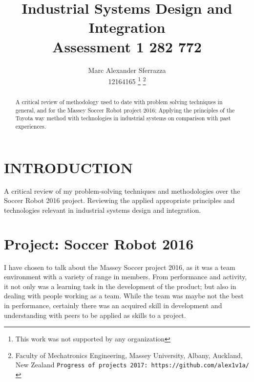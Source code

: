 \documentclass[a4paper, 10pt]{IEEEconf}
\title{\LARGE \bf Industrial Systems Design and Integration\\Assessment 1 282 772}
\author{Marc Alexander Sferrazza \\ 12164165
\thanks{This work was not supported by any organization}
\thanks{Faculty of Mechatronics Engineering, Massey University, Albany, Auckland, New Zealand
        {\tt\small Progress of projects 2017: https://github.com/alex1v1a/} } }
\begin{document}
\maketitle




\thispagestyle{empty}
\pagestyle{plain}



\begin{abstract}
A critical review of methodology used to date with problem solving techniques in general, and for the Massey Soccer Robot project 2016; Applying the principles of the Toyota way method with technologies in industrial systems on comparison with past experiences.
\end{abstract}


\clearpage
\tableofcontents
\thispagestyle{empty}
\clearpage
\twocolumn


\setcounter{page}{1}

\section{INTRODUCTION}

A critical review of my problem-solving techniques and methodologies over the Soccer Robot 2016 project. Reviewing the applied appropriate principles and technologies relevant in industrial systems design and integration.



\section{Project: Soccer Robot 2016}

I have chosen to talk about the Massey Soccer project 2016, as it was a team environment with a variety of range in members. From performance and activity, it not only was a learning task in the development of the product; but also in dealing with people working as a team. While the team was maybe not the best in performance, certainly there was an acquired skill in development and understanding with peers to be applied as skills to a project.
\end{document}
